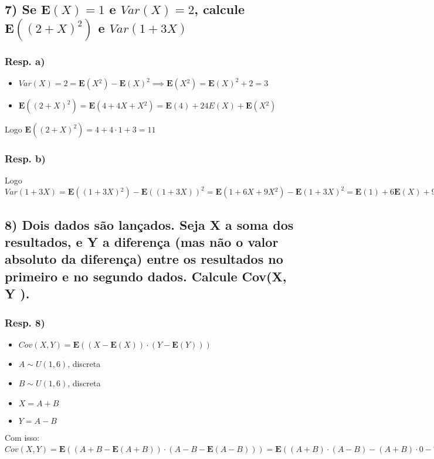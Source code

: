 \documentclass[english]{article}
\begin{document}
\subsection*{\textmd{7) Se $\mathbf{E}(X)=1$ e $Var(X)=2$, calcule }$\mathbf{E}((2+X)^{2})$\textmd{
e $Var(1+3X)$}}


\subsubsection*{\textmd{Resp. a) }}
\begin{itemize}
\item $Var(X)=2=\mathbf{E}(X{}^{2})-\mathbf{E}(X)^{2}\implies\mathbf{E}(X{}^{2})=\mathbf{E}(X)^{2}+2=3$
\item $\mathbf{E}((2+X)^{2})=\mathbf{E}(4+4X+X{}^{2})=\mathbf{E}(4)+24E(X)+\mathbf{E}(X{}^{2})$
\end{itemize}
Logo $\mathbf{E}((2+X)^{2})=4+4\cdot1+3=11$


\subsubsection*{\textmd{Resp. b)}}

Logo $Var(1+3X)=\mathbf{E}((1+3X){}^{2})-\mathbf{E}((1+3X))^{2}=\mathbf{E}(1+6X+9X{}^{2})-\mathbf{E}(1+3X)^{2}=\mathbf{E}(1)+6\mathbf{E}(X)+9\mathbf{E}(X{}^{2})-\mathbf{E}(1+3X)^{2}=34-(\mathbf{E}(1)+3\mathbf{E}(X))\cdot(\mathbf{E}(1)+3\mathbf{E}(X))=34-(1+3\cdot1)\cdot(1+3\cdot1)=18$


\subsection*{\textcompwordmark{}}


\subsection*{\textmd{8) Dois dados são lançados. Seja X a soma dos resultados,
e Y a diferença (mas não o valor absoluto da diferença) entre os resultados
no primeiro e no segundo dados. Calcule Cov(X, Y ).}}


\subsubsection*{\textmd{Resp. 8) }}
\begin{itemize}
\item $Cov(X,Y)=\mathbf{E}((X-\mathbf{E}(X))\cdot(Y-\mathbf{E}(Y)))$
\item $A\sim U(1,6)$, discreta
\item $B\sim U(1,6)$, discreta
\item $X=A+B$
\item $Y=A-B$
\end{itemize}
Com isso: $Cov(X,Y)=\mathbf{E}((A+B-\mathbf{E}(A+B))\cdot(A-B-\mathbf{E}(A-B)))=\mathbf{E}((A+B)\cdot(A-B)-(A+B)\cdot0-7\cdot(A-B)+7\cdot0)=\mathbf{E}((A^{2}-B^{2}-7\cdot(A-B))=\mathbf{E}(A^{2})-\mathbf{E}(B^{2})=0$
\end{document}
